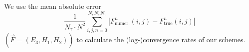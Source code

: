 \documentclass[12pt,reqno]{amsart}
\theoremstyle{definition}
\numberwithin{equation}{section}
\begin{document}
	
	We use the mean absolute error 
	$$
	\frac{1}{N_{\tau}\cdot N^2}\sum_{i,j,n=0}^{N,N,N_{\tau}}\left | F^n_{\mathrm{numer.}}(i,j)-F_{\mathrm{true}}^n(i,j) \right|
	$$
	$(\vec{F}=(E_3,H_1,H_2))$ to calculate the (log-)convergence rates of our schemes.
		
\end{document}
